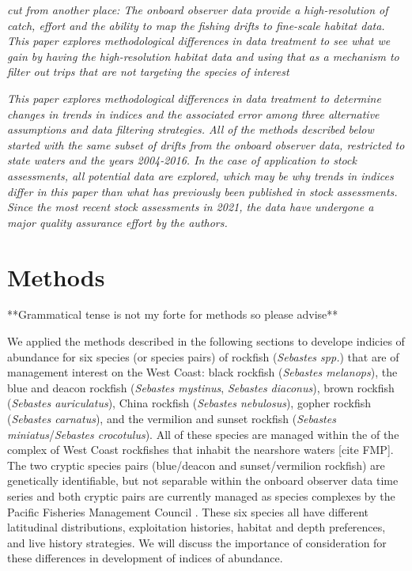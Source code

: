 \documentclass[
  authoryear,
  preprint,
  3p]{elsarticle}
\begin{document}
\emph{cut from another place: The onboard observer data provide a
high-resolution of catch, effort and the ability to map the fishing
drifts to fine-scale habitat data. This paper explores methodological
differences in data treatment to see what we gain by having the
high-resolution habitat data and using that as a mechanism to filter out
trips that are not targeting the species of interest}

\emph{This paper explores methodological differences in data treatment
to determine changes in trends in indices and the associated error among
three alternative assumptions and data filtering strategies. All of the
methods described below started with the same subset of drifts from the
onboard observer data, restricted to state waters and the years
2004-2016. In the case of application to stock assessments, all
potential data are explored, which may be why trends in indices differ
in this paper than what has previously been published in stock
assessments. Since the most recent stock assessments in 2021, the data
have undergone a major quality assurance effort by the authors.}

\hypertarget{methods}{%
\section{Methods}\label{methods}}

**Grammatical tense is not my forte for methods so please advise**

We applied the methods described in the following sections to develope
indicies of abundance for six species (or species pairs) of rockfish
(\emph{Sebastes spp.}) that are of management interest on the West
Coast: black rockfish (\emph{Sebastes melanops}), the blue and deacon
rockfish (\emph{Sebastes mystinus}, \emph{Sebastes diaconus}), brown
rockfish (\emph{Sebastes auriculatus}), China rockfish (\emph{Sebastes
nebulosus}), gopher rockfish (\emph{Sebastes carnatus}), and the
vermilion and sunset rockfish (\emph{Sebastes miniatus}/\emph{Sebastes
crocotulus}). All of these species are managed within the of the complex
of West Coast rockfishes that inhabit the nearshore waters {[}cite
FMP{]}. The two cryptic species pairs (blue/deacon and sunset/vermilion
rockfish) are genetically identifiable, but not separable within the
onboard observer data time series and both cryptic pairs are currently
managed as species complexes by the Pacific Fisheries Management Council
\citep{Bizzarro:2020:GIB, Longo:2022:GMR}. These six species all have
different latitudinal distributions, exploitation histories, habitat and
depth preferences, and live history strategies\citep{Love:2002:RNP}. We
will discuss the importance of consideration for these differences in
development of indices of abundance.
\end{document}
